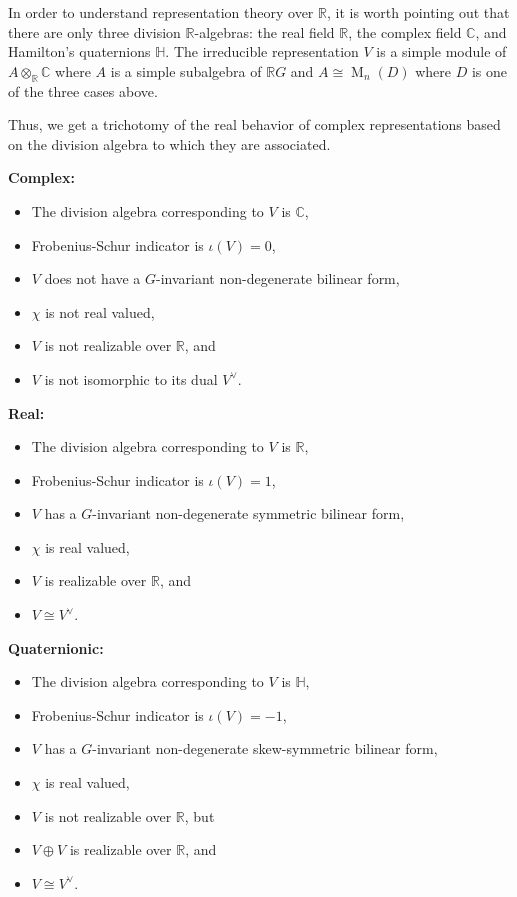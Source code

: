 \documentclass[12pt]{article}
\theoremstyle{plain}
\theoremstyle{definition}
\theoremstyle{remark}
\numberwithin{equation}{section}
\begin{document}
In order to understand representation theory over $\mathbb{R}$, it is
worth pointing out that there are only three division
$\mathbb{R}$-algebras:
the real field $\mathbb{R}$,
the complex field $\mathbb{C}$, and
Hamilton's quaternions $\mathbb{H}$.
The irreducible representation $V$ is a simple module of
$A \otimes_{\mathbb{R}} \mathbb{C}$ where $A$ is a simple subalgebra of
$\mathbb{R}G$ and $A \cong \operatorname{M}_n(D)$ where $D$ is one of
the three cases above.

Thus, we get a trichotomy of the real behavior of complex
representations based on the division algebra to which they are
associated.

\pagebreak

\noindent
\textbf{Complex:}
\begin{itemize}
\item The division algebra corresponding to $V$ is $\mathbb{C}$,
\item Frobenius-Schur indicator is $\iota(V)=0$,
\item $V$ does not have a $G$-invariant non-degenerate bilinear form,
\item $\chi$ is not real valued,
\item $V$ is not realizable over $\mathbb{R}$, and
\item $V$ is not isomorphic to its dual $V^\vee$.
\end{itemize}

\noindent
\textbf{Real:}
\begin{itemize}
\item The division algebra corresponding to $V$ is $\mathbb{R}$,
\item Frobenius-Schur indicator is $\iota(V)=1$,
\item $V$ has a $G$-invariant non-degenerate symmetric bilinear form,
\item $\chi$ is real valued,
\item $V$ is realizable over $\mathbb{R}$, and
\item $V \cong V^\vee$.
\end{itemize}

\noindent
\textbf{Quaternionic:}
\begin{itemize}
\item The division algebra corresponding to $V$ is $\mathbb{H}$,
\item Frobenius-Schur indicator is $\iota(V)=-1$,
\item $V$ has a $G$-invariant non-degenerate skew-symmetric bilinear form,
\item $\chi$ is real valued,
\item $V$ is not realizable over $\mathbb{R}$, but
\item $V \oplus V$ is realizable over $\mathbb{R}$, and
\item $V \cong V^\vee$.
\end{itemize}
\end{document}
